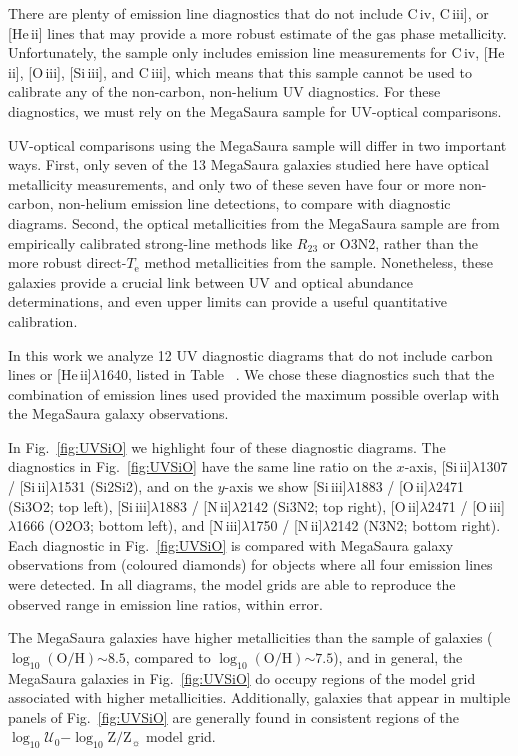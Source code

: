\documentclass[preprint2]{aastex62}
\newcommand{\nii}{[N\,{\sc ii}]\xspace}
\newcommand{\niii}{[N\,{\sc iii}]\xspace}
\newcommand{\oiii}{[O\,{\sc iii}]\xspace}
\newcommand{\oii}{[O\,{\sc ii}]\xspace}
\newcommand{\heii}{[He\,{\sc ii}]\xspace}
\newcommand{\civ}{C\,{\sc iv}\xspace}
\newcommand{\SiuII}{[Si\,{\sc ii}]\xspace}
\newcommand{\SiuIII}{[Si\,{\sc iii}]\xspace}
\newcommand{\ciii}{C\,{\sc iii}]\xspace}
\newcommand{\logten}{\ensuremath{\log_{10}}}
\newcommand{\logZ}{\ensuremath{\logten \mathrm{Z}/\mathrm{Z}_{\sun}}\xspace}
\newcommand{\logOH}{\ensuremath{\logten (\mathrm{O}/\mathrm{H})}\xspace}
\newcommand{\logU}{\ensuremath{\logten \mathcal{U}_0}}
\newcommand{\mage}{{\sc Meg}a{\sc S}a{\sc ura}\xspace}
\newcommand{\Te}{\ensuremath{T_{\mathrm{e}}}\xspace}
\newcommand{\XXX}{{\bf \color{red}{XXX} }}
\begin{document}
There are plenty of emission line diagnostics that do not include \civ, \ciii, or \heii lines that may provide a more robust estimate of the gas phase metallicity. Unfortunately, the \citet{Berg+2016} sample only includes emission line measurements for \civ, \heii, \oiii, \SiuIII, and \ciii, which means that this sample cannot be used to calibrate any of the non-carbon, non-helium UV diagnostics. For these diagnostics, we must rely on the \mage sample for UV-optical comparisons.

UV-optical comparisons using the \mage sample will differ in two important ways. First, only seven of the 13 \mage galaxies studied here have optical metallicity measurements, and only two of these seven have four or more non-carbon, non-helium emission line detections, to compare with diagnostic diagrams. Second, the optical metallicities from the \mage sample are from empirically calibrated strong-line methods like $R_{23}$ or O3N2, rather than the more robust direct-\Te method metallicities from the \citet{Berg+2016} sample. Nonetheless, these galaxies provide a crucial link between UV and optical abundance determinations, and even upper limits can provide a useful quantitative calibration.

In this work we analyze 12 UV diagnostic diagrams that do not include carbon lines or \heii$\lambda$1640, listed in Table~\XXX. We chose these diagnostics such that the combination of emission lines used provided the maximum possible overlap with the \mage galaxy observations.

In Fig.~\ref{fig:UVSiO} we highlight four of these diagnostic diagrams. The diagnostics in Fig.~\ref{fig:UVSiO} have the same line ratio on the $x$-axis, \SiuII$\lambda$1307 / \SiuII$\lambda$1531 (Si2Si2), and on the $y$-axis we show \SiuIII$\lambda$1883 / \oii$\lambda$2471  (Si3O2; top left), \SiuIII$\lambda$1883 / \nii$\lambda$2142 (Si3N2; top right), \oii$\lambda$2471 / \oiii$\lambda$1666 (O2O3; bottom left), and \niii$\lambda$1750 / \nii$\lambda$2142 (N3N2; bottom right). Each diagnostic in Fig.~\ref{fig:UVSiO} is compared with \mage galaxy observations from \citet{Rigby+2018b} (coloured diamonds) for objects where all four emission lines were detected. In all diagrams, the model grids are able to reproduce the observed range in emission line ratios, within error.

The \mage galaxies have higher metallicities than the \citet{Berg+2016} sample of galaxies (\logOH${\sim}8.5$, compared to \logOH${\sim}7.5$), and in general, the \mage galaxies in Fig.~\ref{fig:UVSiO} do occupy regions of the model grid associated with higher metallicities. Additionally, galaxies that appear in multiple panels of Fig.~\ref{fig:UVSiO} are generally found in consistent regions of the \logU$-$\logZ model grid.
\end{document}
